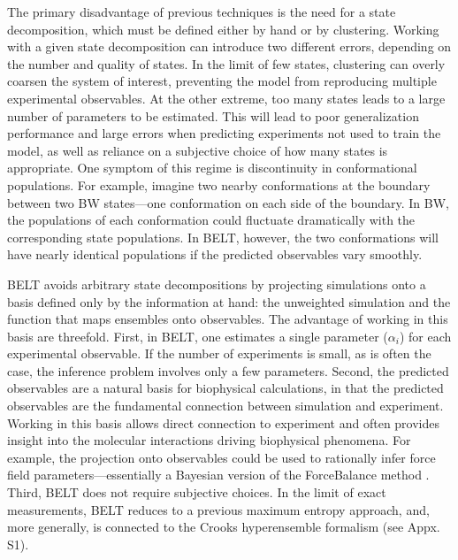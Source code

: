 \documentclass[12pt]{article}
\begin{document}
The primary disadvantage of previous techniques is the need for a state decomposition, which must be defined either by hand or by clustering.  Working with a given state decomposition can introduce two different errors, depending on the number  and quality of states.  In the limit of few states, clustering can overly coarsen the system of interest, preventing the model from reproducing multiple experimental observables.  At the other extreme, too many states leads to a large number of parameters to be estimated. This will lead to poor generalization performance and large errors when predicting experiments not used to train the model, as well as reliance on a subjective choice of how many states is appropriate.  One symptom of this regime is discontinuity in conformational populations. For example, imagine two nearby conformations at the boundary between two BW states---one conformation on each side of the boundary.  In BW, the populations of each conformation could fluctuate dramatically with the 
corresponding state populations.  In BELT, however, the two conformations will have nearly identical populations if the predicted observables vary smoothly.

BELT avoids arbitrary state decompositions by projecting simulations onto a basis defined only by the information at hand: the unweighted simulation and the function that maps ensembles onto observables.  The advantage of working in this basis are threefold. First, in BELT, one estimates a single parameter ($\alpha_i$) for each experimental observable.  If the number of experiments is small, as is often the case, the inference problem involves only a few parameters.  Second, the predicted observables are a natural basis for biophysical calculations, in that the predicted observables are the fundamental connection between simulation and experiment.  Working in this basis allows direct connection to experiment and often provides insight into the molecular interactions driving biophysical phenomena.  For example, the projection onto observables could be used to rationally infer force field parameters---essentially a Bayesian version of the ForceBalance method  \cite{wang2012, wang2013systematic}.  Third, BELT 
does not require subjective choices.  In the limit of exact measurements, BELT reduces to a previous  \cite{chodera2012} maximum entropy approach, and, more generally, is connected to the Crooks hyperensemble formalism (see Appx. S1).  
\end{document}
